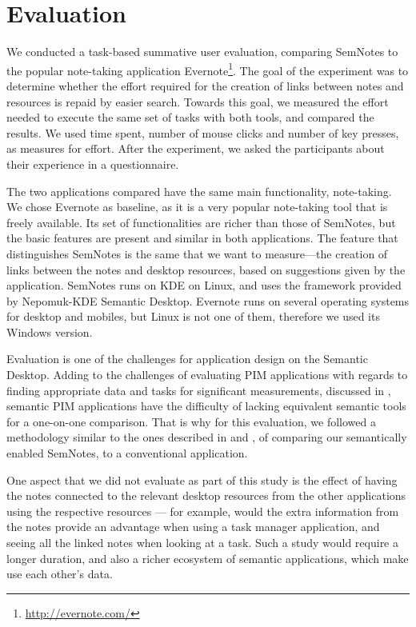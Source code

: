 \section{Evaluation}
\label{sec:semnotesevaluation}

We conducted a task-based summative user evaluation, comparing SemNotes to the popular note-taking application Evernote\footnote{\url{http://evernote.com/}}. The goal of the experiment was to determine whether the effort required for the creation of links between notes and resources is repaid by easier search. Towards this goal, we measured the effort needed to execute the same set of tasks with both tools, and compared the results. We used time spent, number of mouse clicks and number of key presses, as measures for effort. After the experiment, we asked the participants about their experience in a questionnaire.

The two applications compared have the same main functionality, note-taking. We chose Evernote as baseline, as it is a very popular note-taking tool that is freely available. Its set of functionalities are richer than those of SemNotes, but the basic features are present and similar in both applications. The feature that distinguishes SemNotes is the same that we want to measure---the creation of links between the notes and desktop resources, based on suggestions given by the application. SemNotes runs on KDE on Linux, and uses the framework provided by Nepomuk-KDE Semantic Desktop. Evernote runs on several operating systems for desktop and mobiles, but Linux is not one of them, therefore we used its Windows version. 

Evaluation is one of the challenges for application design on the Semantic Desktop. Adding to the challenges of evaluating PIM applications with regards to finding appropriate data and tasks for significant measurements, discussed in \cite{Kelly2006}, semantic PIM applications have the difficulty of lacking equivalent semantic tools for a one-on-one comparison. That is why for this evaluation, we followed a methodology similar to the ones described in \cite{Elsweiler2007} and \cite{Franz2009}, of comparing our semantically enabled SemNotes, to a conventional application.

One aspect that we did not evaluate as part of this study is the effect of having the notes connected to the relevant desktop resources from the other applications using the respective resources --- for example, would the extra information from the notes provide an advantage when using a task manager application, and seeing all the linked notes when looking at a task. Such a study would require a longer duration, and also a richer ecosystem of semantic applications, which make use each other's data.

